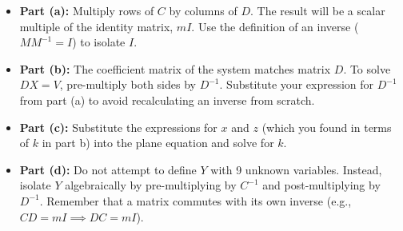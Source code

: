 \begin{hint}
\begin{itemize}
    \item \textbf{Part (a):} Multiply rows of $C$ by columns of $D$. The result will be a scalar multiple of the identity matrix, $mI$. Use the definition of an inverse ($M M^{-1} = I$) to isolate $I$.
    \item \textbf{Part (b):} The coefficient matrix of the system matches matrix $D$. To solve $DX = V$, pre-multiply both sides by $D^{-1}$. Substitute your expression for $D^{-1}$ from part (a) to avoid recalculating an inverse from scratch.
    \item \textbf{Part (c):} Substitute the expressions for $x$ and $z$ (which you found in terms of $k$ in part b) into the plane equation and solve for $k$.
    \item \textbf{Part (d):} Do not attempt to define $Y$ with 9 unknown variables. Instead, isolate $Y$ algebraically by pre-multiplying by $C^{-1}$ and post-multiplying by $D^{-1}$. Remember that a matrix commutes with its own inverse (e.g., $CD = mI \implies DC = mI$).
\end{itemize}
\end{hint}

